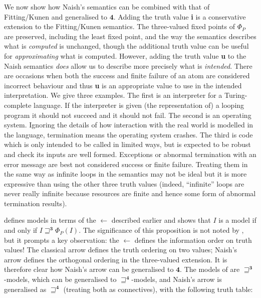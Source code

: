 \documentclass{tlp}
\newcommand{\Tri}{\ensuremath{\mathbf{3}}}
\newcommand{\Quad}{\ensuremath{\mathbf{4}}}
\begin{document}
We now show how Naish's semantics can be combined with that of
Fitting/Kunen and generalised to \Quad.
Adding the truth value \textbf{i} is a conservative extension to the
Fitting/Kunen semantics.  The three-valued fixed points of $\Phi_P$ are
preserved, including the least fixed point, and the
way the semantics describes what is \emph{computed} is unchanged,
though the additional truth value can be useful for \emph{approximating}
what is computed.
However, adding the truth value \textbf{u} to the Naish semantics
\emph{does} allow us to describe more precisely  what is \emph{intended}.
There are occasions when both the success and finite failure of an atom
are considered incorrect behaviour and thus \textbf{u} is an appropriate
value to use in the intended interpretation.  We give three examples.
The first is an interpreter for a Turing-complete language.  If the
interpreter is given (the representation of) a looping program it should
not succeed and it should not fail.  The second is an operating system.
Ignoring the details of how interaction with the real world is modelled
in the language, termination means the operating system crashes.
The third is code which is only intended to be called in limited ways,
but is expected to be robust and check its inputs are well formed.
Exceptions or abnormal termination with an error message are best not
considered success or finite failure.  Treating them in the same way as
infinite loops in the semantics may not be ideal but it is more expressive
than using the other three truth values (indeed, ``infinite'' loops are
never really infinite because resources are finite and hence some form
of abnormal termination results).

defines models in terms of the $\leftarrow$ described earlier and shows
that $I$ is a model if and only if 
$I \sqsupseteq^\Tri \Phi_P(I)$.
The significance of this proposition is not noted by ,
but it prompts a key observation: the $\leftarrow$
defines the information order on truth values!  The classical arrow
defines the truth ordering on two values; Naish's arrow defines the
orthogonal ordering in the three-valued extension.  It is therefore
clear how Naish's arrow can be generalised to $\Quad$.
The models of
 are $\sqsupseteq^\Tri$-models, which can be
generalised to $\sqsupseteq^\Quad$-models, and Naish's arrow
is generalised as $\sqsupseteq^\Quad$ (treating both as connectives),
with the following truth table:
\end{document}

